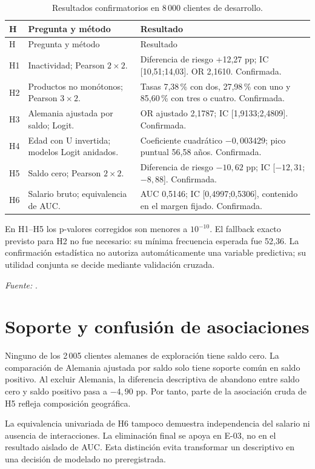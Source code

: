 \documentclass[11pt,a4paper,oneside]{report}
\newcommand{\fuente}[1]{\par{\footnotesize\textit{Fuente:} \path{#1}.}\par}
\begin{document}
\begin{longtable}{@{}L{0.1\textwidth}L{0.39\textwidth}L{0.42\textwidth}@{}}
\caption{Resultados confirmatorios en 8\,000 clientes de desarrollo.}\\
\toprule H & Pregunta y método & Resultado \\\midrule\endfirsthead
\toprule H & Pregunta y método & Resultado \\\midrule\endhead
H1 & Inactividad; Pearson $2\times2$. & Diferencia de riesgo +12,27 pp;
IC [10,51;14,03]. OR 2,1610. Confirmada. \\
H2 & Productos no monótonos; Pearson $3\times2$. & Tasas 7,38\,\% con dos,
27,98\,\% con uno y 85,60\,\% con tres o cuatro. Confirmada. \\
H3 & Alemania ajustada por saldo; Logit. & OR ajustado 2,1787;
IC [1,9133;2,4809]. Confirmada. \\
H4 & Edad con U invertida; modelos Logit anidados. & Coeficiente cuadrático
$-0{,}003429$; pico puntual 56,58 años. Confirmada. \\
H5 & Saldo cero; Pearson $2\times2$. & Diferencia de riesgo $-10{,}62$ pp;
IC [$-12{,}31$;$-8{,}88$]. Confirmada. \\
H6 & Salario bruto; equivalencia de AUC. & AUC 0,5146;
IC [0,4997;0,5306], contenido en el margen fijado. Confirmada. \\
\bottomrule
\end{longtable}
En H1--H5 los p-valores corregidos son menores a $10^{-10}$. El fallback
exacto previsto para H2 no fue necesario: su mínima frecuencia esperada fue
52,36. La confirmación estadística no autoriza automáticamente una variable
predictiva; su utilidad conjunta se decide mediante validación cruzada.
\fuente{reports/eda_hypotheses.md}

\section{Soporte y confusión de asociaciones}
Ninguno de los 2\,005 clientes alemanes de exploración tiene saldo cero. La
comparación de Alemania ajustada por saldo solo tiene soporte común en saldo
positivo. Al excluir Alemania, la diferencia descriptiva de abandono entre
saldo cero y saldo positivo pasa a $-4{,}90$ pp. Por tanto, parte de la
asociación cruda de H5 refleja composición geográfica.

La equivalencia univariada de H6 tampoco demuestra independencia del salario
ni ausencia de interacciones. La eliminación final se apoya en E-03, no en el
resultado aislado de AUC. Esta distinción evita transformar un descriptivo en
una decisión de modelado no preregistrada.
\end{document}
